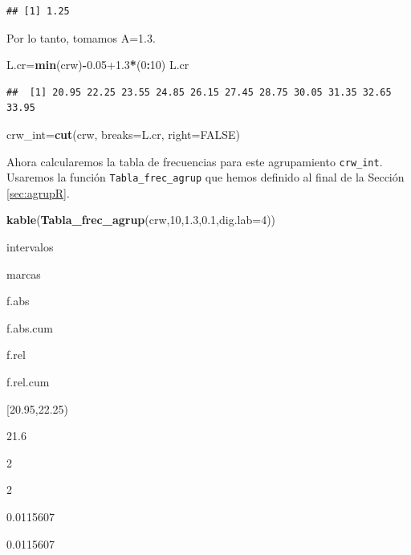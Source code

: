 \documentclass[]{book}
\newenvironment{Shaded}{\begin{snugshade}}{\end{snugshade}}
\newcommand{\DataTypeTok}[1]{\textcolor[rgb]{0.13,0.29,0.53}{#1}}
\newcommand{\DecValTok}[1]{\textcolor[rgb]{0.00,0.00,0.81}{#1}}
\newcommand{\FloatTok}[1]{\textcolor[rgb]{0.00,0.00,0.81}{#1}}
\newcommand{\KeywordTok}[1]{\textcolor[rgb]{0.13,0.29,0.53}{\textbf{#1}}}
\newcommand{\NormalTok}[1]{#1}
\newcommand{\OperatorTok}[1]{\textcolor[rgb]{0.81,0.36,0.00}{\textbf{#1}}}
\newcommand{\OtherTok}[1]{\textcolor[rgb]{0.56,0.35,0.01}{#1}}
\theoremstyle{definition}
\theoremstyle{definition}
\theoremstyle{definition}
\theoremstyle{remark}
\begin{document}
\begin{verbatim}
## [1] 1.25
\end{verbatim}

Por lo tanto, tomamos A=1.3.

\begin{Shaded}
\begin{Highlighting}[]
\NormalTok{L.cr=}\KeywordTok{min}\NormalTok{(crw)}\OperatorTok{-}\FloatTok{0.05+1.3}\OperatorTok{*}\NormalTok{(}\DecValTok{0}\OperatorTok{:}\DecValTok{10}\NormalTok{)}
\NormalTok{L.cr}
\end{Highlighting}
\end{Shaded}

\begin{verbatim}
##  [1] 20.95 22.25 23.55 24.85 26.15 27.45 28.75 30.05 31.35 32.65 33.95
\end{verbatim}

\begin{Shaded}
\begin{Highlighting}[]
\NormalTok{crw_int=}\KeywordTok{cut}\NormalTok{(crw, }\DataTypeTok{breaks=}\NormalTok{L.cr, }\DataTypeTok{right=}\OtherTok{FALSE}\NormalTok{)}
\end{Highlighting}
\end{Shaded}

Ahora calcularemos la tabla de frecuencias para este agrupamiento \texttt{crw\_int}. Usaremos la función
\texttt{Tabla\_frec\_agrup} que hemos definido al final de la Sección \ref{sec:agrupR}.

\begin{Shaded}
\begin{Highlighting}[]
\KeywordTok{kable}\NormalTok{(}\KeywordTok{Tabla_frec_agrup}\NormalTok{(crw,}\DecValTok{10}\NormalTok{,}\FloatTok{1.3}\NormalTok{,}\FloatTok{0.1}\NormalTok{,}\DataTypeTok{dig.lab=}\DecValTok{4}\NormalTok{))}
\end{Highlighting}
\end{Shaded}

intervalos

marcas

f.abs

f.abs.cum

f.rel

f.rel.cum

{[}20.95,22.25)

21.6

2

2

0.0115607

0.0115607
\end{document}
